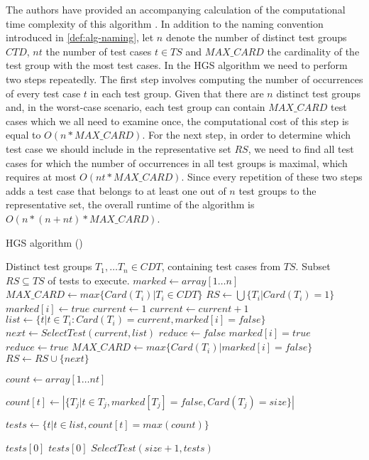 \noindent The authors have provided an accompanying calculation of the computational time complexity of this algorithm \cite{hgs}. In addition to the naming convention introduced in \cref{def:alg-naming}, let $n$ denote the number of distinct test groups $CTD$, $nt$ the number of test cases $t \in TS$ and $MAX\_CARD$ the cardinality of the test group with the most test cases. In the HGS algorithm we need to perform two steps repeatedly. The first step involves computing the number of occurrences of every test case $t$ in each test group. Given that there are $n$ distinct test groups and, in the worst-case scenario, each test group can contain $MAX\_CARD$ test cases which we all need to examine once, the computational cost of this step is equal to $O(n * MAX\_CARD)$. For the next step, in order to determine which test case we should include in the representative set $RS$, we need to find all test cases for which the number of occurrences in all test groups is maximal, which requires at most $O(nt * MAX\_CARD)$. Since every repetition of these two steps adds a test case that belongs to at least one out of $n$ test groups to the representative set, the overall runtime of the algorithm is $O(n * (n + nt) * MAX\_CARD)$.\\

\begin{algorithm}[h!]
\caption{HGS algorithm (\cite{hgs})}
\label{alg:hgs}
\begin{algorithmic}[1]
	 Distinct test groups $T_1, \dots T_n \in CDT$, containing test cases from $TS$.
	 Subset $RS \subseteq TS$ of tests to execute.
	\State $marked \gets array[1 \dots n]$ 
	\State $MAX\_CARD \gets max \{Card(T_i) \vert T_i \in CDT\}$
	\State $RS \gets \bigcup \{ T_i \vert Card(T_i) = 1 \}$
		 $marked[i] \gets true$ \EndIf
	\EndFor
	\State $current \gets 1$
		\State $current \gets current + 1$
			\State $list \gets \{t \vert t \in T_i : Card(T_i) = current, marked[i] = false\}$
			\State $next \gets SelectTest(current, list)$
			\State $reduce \gets false$
					\State $marked[i] = true$
					 $reduce \gets true$ \EndIf
				\EndIf
			\EndFor
				\State $MAX\_CARD \gets max \{Card(T_i) \vert marked[i] = false\}$
			\EndIf
			\State $RS \gets RS \cup \{next\}$
		\EndWhile
	\EndWhile
	
		\State $count\gets array[1 \dots nt]$
		
			\State $count[t] \gets |\{T_j \vert t \in T_j, marked[T_j] = false, Card(T_j) = size\}|$
		\EndFor
		
		\State $tests \gets \{t \vert t \in list, count[t] = max(count) \}$
		
		 \Return $tests[0]$
		 \Return $tests[0]$
		\Else{} \Return $SelectTest(size+1, tests)$
		\EndIf
	\EndFunction
\end{algorithmic}
\end{algorithm}